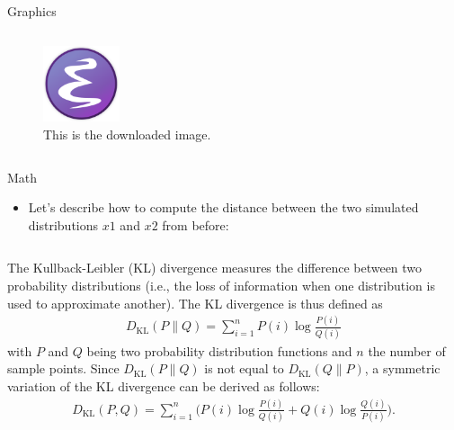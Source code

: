 \documentclass[final]{beamer}
\newcommand\sumin{\sum_{i=1}^{n}}
\newcommand{\Xoi}[1]{#1(i)}
\newcommand{\frakPQ}[2]{\frac{\Xoi{#1}}{\Xoi{#2}}}
\newcommand{\DKLPQ}[3]{D_{\mathrm{KL}}(#1 #3 #2)}
\begin{document}
\begin{frame}[fragile,label={sec:org48aedac}]{}
\begin{columns}
\begin{column}[t]{0.45\columnwidth}
\begin{block}{Graphics}
\begin{columns}
\begin{column}[T]{0.78\columnwidth}
\vspace{2cm}

\begin{figure}[htbp]
\centering
\includegraphics[page=9,width=0.2\textwidth]{emacs.png}
\caption{\label{fig:orgcbcb8d7}
This is the downloaded image.}
\end{figure}
\end{column}
\end{columns}
\end{block}

\begin{block}{Math}
\begin{itemize}
\item Let's describe how to compute the distance between the
two simulated distributions \(x1\) and \(x2\) from before:
\end{itemize}

\begin{columns}
\begin{column}[T]{0.78\columnwidth}
\small
The Kullback-Leibler (KL) divergence measures the difference between two
probability distributions (i.e., the loss of information when one
distribution is used to approximate another). The KL divergence is thus
defined as
\begin{align} 
\label{eq:KL} 
\DKLPQ{P}{Q}{\|} = \sumin \Xoi{P} \log \frakPQ{P}{Q}
\end{align} 
with \(P\) and \(Q\) being two probability distribution functions and \(n\)
the number of sample points. Since \(\DKLPQ{P}{Q}{\|}\) is not equal to
\(\DKLPQ{Q}{P}{\|}\), a symmetric variation of the KL divergence can be
derived as follows:
\small
\begin{align} 
\label{eq:KL2} 
\DKLPQ{P}{Q}{,} = \sumin \Big(\Xoi{P} \log \frakPQ{P}{Q} + \Xoi{Q} \log \frakPQ{Q}{P} \Big).
\end{align}
\end{column}
\end{columns}
\end{block}


\end{column}
\end{columns}
\end{frame}
\end{document}
